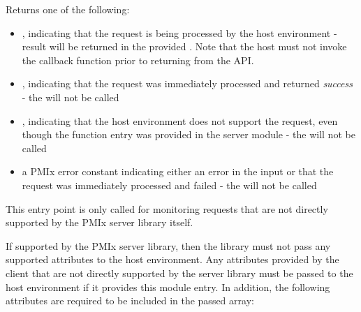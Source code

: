 \begin{arglist}
\end{arglist}

Returns one of the following:

\begin{itemize}
    \item {}, indicating that the request is being processed by the host environment - result will be returned in the provided . Note that the host must not invoke the callback function prior to returning from the \ac{API}.
    \item {}, indicating that the request was immediately processed and returned \textit{success} - the  will not be called
    \item {}, indicating that the host environment does not support the request, even though the function entry was provided in the server module - the  will not be called
    \item a PMIx error constant indicating either an error in the input or that the request was immediately processed and failed - the  will not be called
\end{itemize}

This entry point is only called for monitoring requests that are not directly supported by the \ac{PMIx} server library itself.

\reqattrstart
If supported by the \ac{PMIx} server library, then the library must not pass any supported attributes to the host environment. Any attributes provided by the client that are not directly supported by the server library must be passed to the host environment if it provides this module entry. In addition, the following attributes are required to be included in the passed  array:


